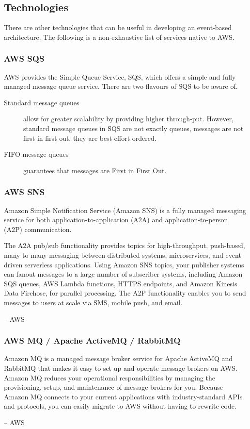 \documentclass{csse4400}
\begin{document}
\subsection{Technologies}

There are other technologies that can be useful in developing an event-based architecture.
The following is a non-exhaustive list of services native to AWS.

\subsubsection{AWS SQS}

AWS provides the Simple Queue Service, SQS,
which offers a simple and fully managed message queue service.
There are two flavours of SQS to be aware of.
\begin{description}
    \item[Standard message queues] allow for greater scalability by providing higher through-put.
However, standard message queues in SQS are not exactly queues,
messages are not first in first out,
they are best-effort ordered.
    \item[FIFO message queues] guarantees that messages are First in First Out.
\end{description}

\subsubsection{AWS SNS}
\begin{oldquote}
Amazon Simple Notification Service (Amazon SNS) is a fully managed messaging service for both application-to-application (A2A) and application-to-person (A2P) communication.

The A2A pub/sub functionality provides topics for high-throughput,
push-based, many-to-many messaging between distributed systems,
microservices, and event-driven serverless applications.
Using Amazon SNS topics,
your publisher systems can fanout messages to a large number of subscriber systems,
including Amazon SQS queues, AWS Lambda functions,
HTTPS endpoints, and Amazon Kinesis Data Firehose,
for parallel processing.
The A2P functionality enables you to send messages to users at scale via SMS, mobile push, and email.

\raggedleft -- AWS
\end{oldquote}

\subsubsection{AWS MQ / Apache ActiveMQ / RabbitMQ}
\begin{oldquote}
Amazon MQ is a managed message broker service for Apache ActiveMQ and RabbitMQ that makes it easy to set up and operate message brokers on AWS.
Amazon MQ reduces your operational responsibilities by managing the provisioning, setup, and maintenance of message brokers for you.
Because Amazon MQ connects to your current applications with industry-standard APIs and protocols,
you can easily migrate to AWS without having to rewrite code.

\raggedleft -- AWS
\end{oldquote}
\end{document}
